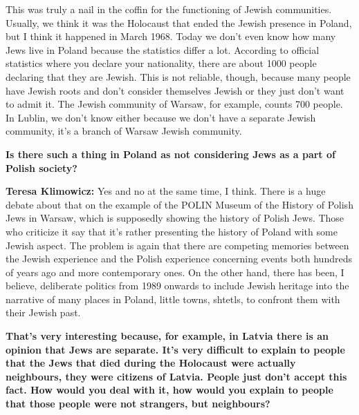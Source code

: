 This was truly a nail in the coffin for the functioning of Jewish communities. Usually, we think it was the Holocaust that ended the Jewish presence in Poland, but I think it happened in March 1968. Today we don't even know how many Jews live in Poland because the statistics differ a lot. According to official statistics where you declare your nationality, there are about 1000 people declaring that they are Jewish. This is not reliable, though, because many people have Jewish roots and don't consider themselves Jewish or they just don't want to admit it. The Jewish community of Warsaw, for example, counts 700 people. In Lublin, we don’t know either because we don't have a separate Jewish community, it's a branch of Warsaw Jewish community.  

\textbf{Is there such a thing in Poland as not considering Jews as a part of Polish society?} 

\textbf{Teresa Klimowicz:} Yes and no at the same time, I think. There is a huge debate about that on the example of the POLIN Museum of the History of Polish Jews in Warsaw, which is supposedly showing the history of Polish Jews. Those who criticize it say that it's rather presenting the history of Poland with some Jewish aspect. The problem is again that there are competing memories between the Jewish experience and the Polish experience concerning events both hundreds of years ago and more contemporary ones. On the other hand, there has been, I believe, deliberate politics from 1989 onwards to include Jewish heritage into the narrative of many places in Poland, little towns, shtetls, to confront them with their Jewish past. 

\textbf{That’s very interesting because, for example, in Latvia there is an opinion that Jews are separate. It’s very difficult to explain to people that the Jews that died during the Holocaust were actually neighbours, they were citizens of Latvia. People just don't accept this fact. How would you deal with it, how would you explain to people that those people were not strangers, but neighbours?} 

